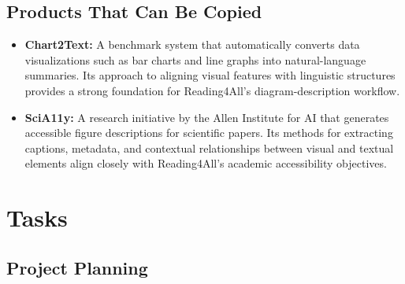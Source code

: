 \documentclass[12pt]{article}
\begin{document}
\subsection{Products That Can Be Copied}

\begin{itemize}
    \item \textbf{Chart2Text:} A benchmark system that automatically converts data visualizations such as bar charts and line graphs into natural-language summaries. Its approach to aligning visual features with linguistic structures provides a strong foundation for Reading4All’s diagram-description workflow.

    \item \textbf{SciA11y:} A research initiative by the Allen Institute for AI that generates accessible figure descriptions for scientific papers. Its methods for extracting captions, metadata, and contextual relationships between visual and textual elements align closely with Reading4All’s academic accessibility objectives.
\end{itemize}
\section{Tasks}

\subsection{Project Planning}
\end{document}
